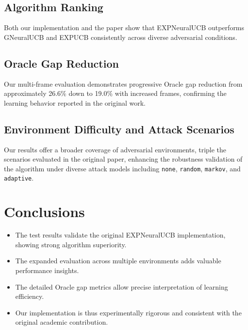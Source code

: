 \documentclass{article}
\begin{document}
\subsection{Algorithm Ranking}
Both our implementation and the paper show that EXPNeuralUCB outperforms GNeuralUCB and EXPUCB consistently across diverse adversarial conditions.

\subsection{Oracle Gap Reduction}
Our multi-frame evaluation demonstrates progressive Oracle gap reduction from approximately 26.6\% down to 19.0\% with increased frames, confirming the learning behavior reported in the original work.

\subsection{Environment Difficulty and Attack Scenarios}
Our results offer a broader coverage of adversarial environments, triple the scenarios evaluated in the original paper, enhancing the robustness validation of the algorithm under diverse attack models including
\texttt{none}, \texttt{random}, \texttt{markov}, and \texttt{adaptive}.

\section{Conclusions}
\begin{itemize}
  \item The test results validate the original EXPNeuralUCB implementation, showing strong algorithm superiority.
  \item The expanded evaluation across multiple environments adds valuable performance insights.
  \item The detailed Oracle gap metrics allow precise interpretation of learning efficiency.
  \item Our implementation is thus experimentally rigorous and consistent with the original academic contribution.
\end{itemize}
\end{document}
